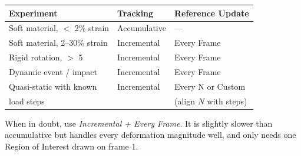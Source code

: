 \begin{center}
\begin{tabular}{lll}
  \toprule
  Experiment & Tracking & Reference Update \\
  \midrule
  Soft material, $<$ 2\% strain & Accumulative & --- \\
  Soft material, 2--30\% strain & Incremental & Every Frame \\
  Rigid rotation, $>$ 5\textdegree{} & Incremental & Every Frame \\
  Dynamic event / impact     & Incremental & Every Frame \\
  Quasi-static with known    & Incremental & Every N or Custom \\
  \quad load steps           &            & (align $N$ with steps) \\
  \bottomrule
\end{tabular}
\end{center}

\begin{notebox}
When in doubt, use \emph{Incremental + Every Frame}. It is slightly
slower than accumulative but handles every deformation magnitude
well, and only needs one Region of Interest drawn on frame 1.
\end{notebox}
